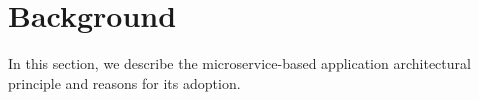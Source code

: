 \section{Background}
\label{sec:background}

In this section, we describe the microservice-based application architectural principle and reasons for its adoption. 


